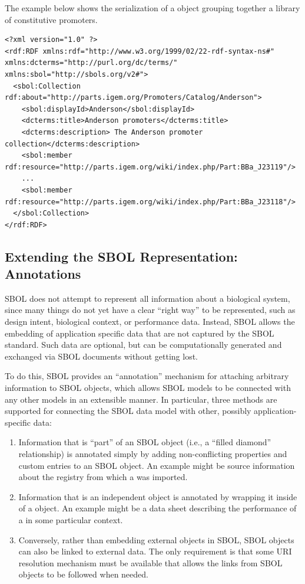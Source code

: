 The example below shows the serialization of a  object grouping together a library of constitutive promoters.
\begin{lstlisting}
<?xml version="1.0" ?>
<rdf:RDF xmlns:rdf="http://www.w3.org/1999/02/22-rdf-syntax-ns#" xmlns:dcterms="http://purl.org/dc/terms/" xmlns:sbol="http://sbols.org/v2#">
  <sbol:Collection rdf:about="http://parts.igem.org/Promoters/Catalog/Anderson">
    <sbol:displayId>Anderson</sbol:displayId>
    <dcterms:title>Anderson promoters</dcterms:title>
    <dcterms:description> The Anderson promoter collection</dcterms:description>
    <sbol:member rdf:resource="http://parts.igem.org/wiki/index.php/Part:BBa_J23119"/>
    ...
    <sbol:member rdf:resource="http://parts.igem.org/wiki/index.php/Part:BBa_J23118"/>
  </sbol:Collection>
</rdf:RDF>

\end{lstlisting}
\label{ser:Collection}

\subsection{Extending the SBOL Representation:  Annotations}
\label{sec:Annotations}
\label{sec:annotations}


SBOL does not attempt to represent all information about a biological system, since many things do not yet have a clear ``right way'' to be represented, such as design intent, biological context, or performance data.  Instead, SBOL allows the embedding of application specific data that are not captured by the SBOL standard.  Such data are optional, but can be computationally generated and exchanged via SBOL documents without getting lost. 

To do this, SBOL provides an ``annotation'' mechanism for attaching arbitrary information to SBOL objects, which allows SBOL models to be connected with any other models in an extensible manner.
In particular, three methods are supported for connecting the SBOL data model with other, possibly application-specific data:
\begin{enumerate}
\item Information that is ``part'' of an SBOL object (i.e., a ``filled diamond'' relationship) is annotated simply by adding non-conflicting properties and custom entries to an SBOL object.  An example might be source information about the registry from which a  was imported.
\item Information that is an independent object is annotated by wrapping it inside of a  object.  An example might be a data sheet describing the performance of a  in some particular context.
\item Conversely, rather than embedding external objects in SBOL, SBOL objects can also be linked to external data.  The only requirement is that some URI resolution mechanism must be available that allows the links from SBOL objects to be followed when needed.
\end{enumerate}

